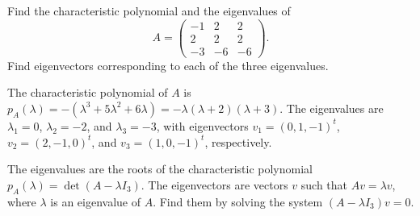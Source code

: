 \documentclass{ximera}
\begin{document}
\begin{exercise} \label{c10.2.5}
Find the characteristic polynomial and the eigenvalues of 
\[
A = \left(\begin{array}{rrr} -1 & 2 & 2 \\ 2 & 2 & 2 \\ -3 & -6 & -6 
\end{array}\right).
\]
Find eigenvectors corresponding to each of the three eigenvalues.

\begin{solution}

\ans The characteristic polynomial of $A$ is $p_A(\lambda) = -(\lambda^3
+ 5\lambda^2 + 6\lambda) = -\lambda(\lambda + 2)(\lambda + 3)$. 
The eigenvalues are $\lambda_1 = 0$, $\lambda_2 = -2$, and $\lambda_3 = -3$,
with eigenvectors $v_1 = (0,1,-1)^t$, $v_2 = (2,-1,0)^t$, and 
$v_3 = (1,0,-1)^t$, respectively.

\soln The eigenvalues are the roots of the characteristic polynomial
$p_A(\lambda) = \det(A - \lambda I_3)$.  The eigenvectors are vectors
$v$ such that $Av = \lambda v$, where $\lambda$ is an eigenvalue of
$A$.  Find them by solving the system $(A - \lambda I_3)v = 0$.

\end{solution}
\end{exercise}
\end{document}
